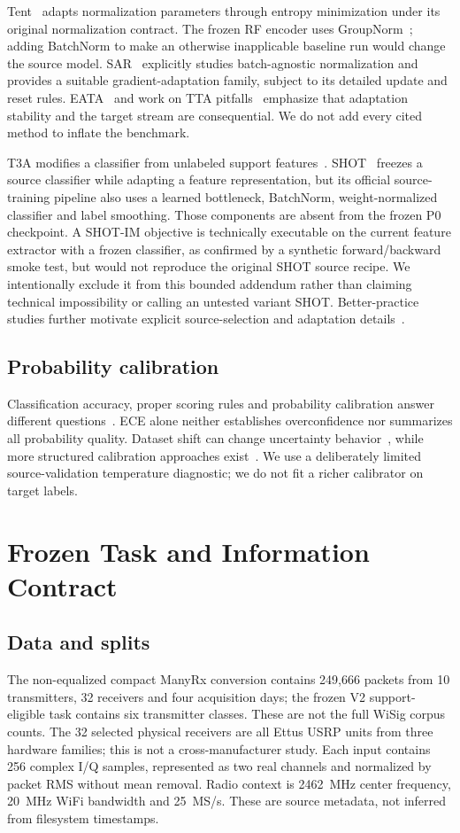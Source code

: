 Tent~\cite{tent} adapts normalization parameters through entropy minimization under its original normalization contract. The frozen RF encoder uses GroupNorm~\cite{groupnorm}; adding BatchNorm to make an otherwise inapplicable baseline run would change the source model. SAR~\cite{sar} explicitly studies batch-agnostic normalization and provides a suitable gradient-adaptation family, subject to its detailed update and reset rules. EATA~\cite{eata} and work on TTA pitfalls~\cite{ttapitfalls} emphasize that adaptation stability and the target stream are consequential. We do not add every cited method to inflate the benchmark.

T3A modifies a classifier from unlabeled support features~\cite{t3a}. SHOT~\cite{shot} freezes a source classifier while adapting a feature representation, but its official source-training pipeline also uses a learned bottleneck, BatchNorm, weight-normalized classifier and label smoothing. Those components are absent from the frozen P0 checkpoint. A SHOT-IM objective is technically executable on the current feature extractor with a frozen classifier, as confirmed by a synthetic forward/backward smoke test, but would not reproduce the original SHOT source recipe. We intentionally exclude it from this bounded addendum rather than claiming technical impossibility or calling an untested variant SHOT. Better-practice studies further motivate explicit source-selection and adaptation details~\cite{betterda}.

\subsection{Probability calibration}
Classification accuracy, proper scoring rules and probability calibration answer different questions~\cite{calibration,evalcal,gneiting,brier}. ECE alone neither establishes overconfidence nor summarizes all probability quality. Dataset shift can change uncertainty behavior~\cite{ovadia}, while more structured calibration approaches exist~\cite{verifiedcal,dirichlet}. We use a deliberately limited source-validation temperature diagnostic; we do not fit a richer calibrator on target labels.

\section{Frozen Task and Information Contract}
\subsection{Data and splits}
The non-equalized compact ManyRx conversion contains 249,666 packets from 10 transmitters, 32 receivers and four acquisition days; the frozen V2 support-eligible task contains six transmitter classes. These are not the full WiSig corpus counts. The 32 selected physical receivers are all Ettus USRP units from three hardware families; this is not a cross-manufacturer study. Each input contains 256 complex I/Q samples, represented as two real channels and normalized by packet RMS without mean removal. Radio context is 2462~MHz center frequency, 20~MHz WiFi bandwidth and 25~MS/s. These are source metadata, not inferred from filesystem timestamps.

